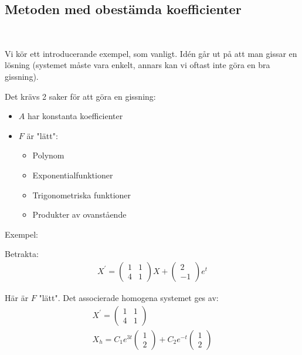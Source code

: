 \subsection{Metoden med obestämda koefficienter}\hfill\\
\par\bigskip
Vi kör ett introducerande exempel, som vanligt. Idén går ut på att man gissar en lösning (systemet måste vara enkelt, annars kan vi oftast inte göra en bra gissning).\par
\noindent Det krävs 2 saker för att göra en gissning:
\begin{itemize}
  \item $A$ har konstanta koefficienter
  \item $F$ är "lätt":
    \begin{itemize}
      \item Polynom
      \item Exponentialfunktioner
      \item Trigonometriska funktioner
      \item Produkter av ovanstående
    \end{itemize}
\end{itemize}
\par\bigskip
\noindent Exempel:\par
\noindent Betrakta:
\begin{equation*}
  \begin{gathered}
    X^{\prime} = \begin{pmatrix}1&1\\4&1\end{pmatrix}X+\begin{pmatrix}2\\-1\end{pmatrix}e^t
  \end{gathered}
\end{equation*}\par
\noindent Här är $F$ "lätt". Det associerade homogena systemet ges av:
\begin{equation*}
  \begin{gathered}
    X^{\prime} = \begin{pmatrix}1&1\\4&1\end{pmatrix}\\
    X_h = C_1e^{3t}\begin{pmatrix}1\\2\end{pmatrix}+C_2e^{-t}\begin{pmatrix}1\\2\end{pmatrix}
  \end{gathered}
\end{equation*}
